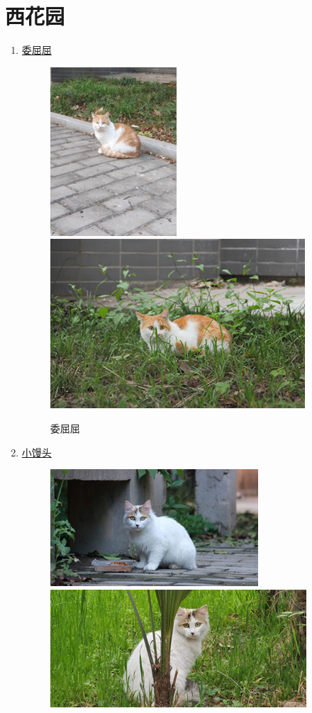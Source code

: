 \documentclass[zihao=-4,fontset=none]{Beautybook-CN}
\begin{document}
\section{西花园}
\begin{enumerate}
    \item \hyperref[img5152]{委屈屈}
    \begin{figure}[htbp]
            \centering
            \includegraphics[width=0.4\linewidth]{media/cimage51.png}
        \qquad
            \includegraphics[width=0.4\linewidth]{media/cimage52.png}
            \caption{委屈屈}
            \label{img5152}
    \end{figure}
        \item \hyperref[img5354]{小馒头}
    \begin{figure}[htbp]
            \centering
            \includegraphics[width=0.4\linewidth]{media/cimage53.png}
        \qquad
            \includegraphics[width=0.4\linewidth]{media/cimage54.png}

\end{figure}
\end{enumerate}
\end{document}
